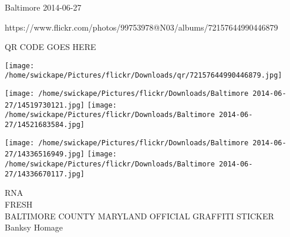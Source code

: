 \documentclass[10pt,letterpaper]{article}
\begin{document}
Baltimore 2014-06-27

https://www.flickr.com/photos/99753978@N03/albums/72157644990446879

QR CODE GOES HERE

\texttt{[image: /home/swickape/Pictures/flickr/Downloads/qr/72157644990446879.jpg]}
\pagebreak

\texttt{[image: /home/swickape/Pictures/flickr/Downloads/Baltimore 2014-06-27/14519730121.jpg]}
\texttt{[image: /home/swickape/Pictures/flickr/Downloads/Baltimore 2014-06-27/14521683584.jpg]}

\texttt{[image: /home/swickape/Pictures/flickr/Downloads/Baltimore 2014-06-27/14336516949.jpg]}
\texttt{[image: /home/swickape/Pictures/flickr/Downloads/Baltimore 2014-06-27/14336670117.jpg]}

RNA\\
FRESH\\
BALTIMORE COUNTY MARYLAND OFFICIAL GRAFFITI STICKER\\
Banksy Homage\\
\pagebreak
\end{document}
